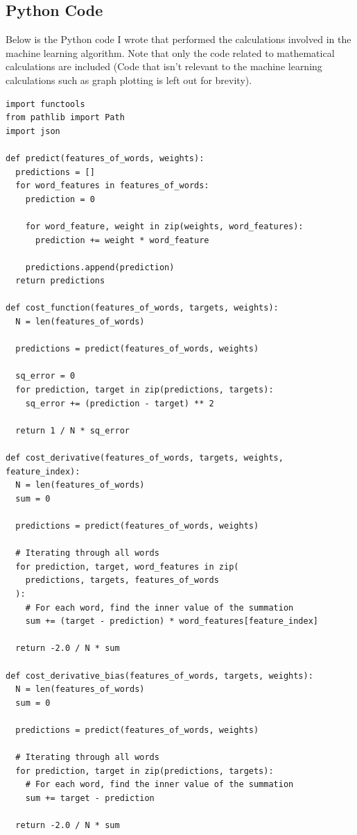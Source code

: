 \documentclass[12pt]{article}
\begin{document}
\subsection*{Python Code}

Below is the Python code I wrote that performed the calculations involved in the machine learning algorithm. Note that only the code related to mathematical calculations are included (Code that isn't relevant to the machine learning calculations such as graph plotting is left out for brevity).
\begin{verbatim}
import functools
from pathlib import Path
import json

def predict(features_of_words, weights):
  predictions = []
  for word_features in features_of_words:
    prediction = 0

    for word_feature, weight in zip(weights, word_features):
      prediction += weight * word_feature

    predictions.append(prediction)
  return predictions

def cost_function(features_of_words, targets, weights):
  N = len(features_of_words)

  predictions = predict(features_of_words, weights)

  sq_error = 0
  for prediction, target in zip(predictions, targets):
    sq_error += (prediction - target) ** 2

  return 1 / N * sq_error

def cost_derivative(features_of_words, targets, weights, feature_index):
  N = len(features_of_words)
  sum = 0

  predictions = predict(features_of_words, weights)

  # Iterating through all words
  for prediction, target, word_features in zip(
    predictions, targets, features_of_words
  ):
    # For each word, find the inner value of the summation
    sum += (target - prediction) * word_features[feature_index]

  return -2.0 / N * sum

def cost_derivative_bias(features_of_words, targets, weights):
  N = len(features_of_words)
  sum = 0

  predictions = predict(features_of_words, weights)

  # Iterating through all words
  for prediction, target in zip(predictions, targets):
    # For each word, find the inner value of the summation
    sum += target - prediction

  return -2.0 / N * sum


\end{verbatim}
\end{document}
